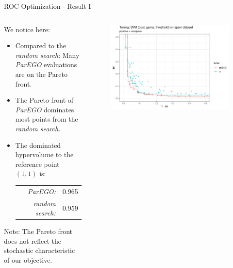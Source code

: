 \begin{frame}{ROC Optimization - Result I}

\begin{columns}
\begin{column}{0.45\textwidth}
  We notice here:
  \begin{itemize}
    \item Compared to the \emph{random search}: Many \emph{ParEGO} evaluations are on the Pareto front.
    \item The Pareto front of \emph{ParEGO} dominates most points from the \emph{random search}.
    \item The dominated hypervolume to the reference point $(1,1)$ is:
    \begin{tabular}{rl}
    \emph{ParEGO:} & 0.965\\ 
    \emph{random search:} & 0.959\\ 
    \end{tabular}
  \end{itemize}
  Note: The Pareto front does not reflect the stochastic characteristic of our objective.
\end{column}%
\begin{column}{0.5\textwidth}
  \begin{figure}
  \includegraphics[width=\textwidth]{images/example_parego_spam.png}
  \end{figure}
\end{column}
\end{columns}
    
\end{frame}

